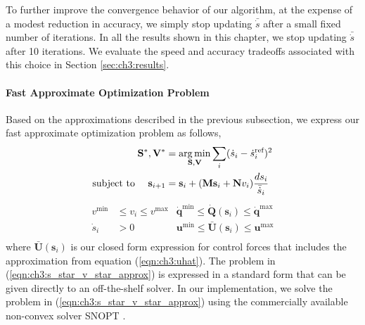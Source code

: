 To further improve the convergence behavior of our algorithm, at the expense of a modest reduction in accuracy, we simply stop updating $\bar{\dot{s}}$ after a small fixed number of iterations.
In all the results shown in this chapter, we stop updating $\bar{\dot{s}}$ after 10 iterations.
We evaluate the speed and accuracy tradeoffs associated with this choice in Section \ref{sec:ch3:results}.

\paragraph{Fast Approximate Optimization Problem}

Based on the approximations described in the previous subsection, we express our fast approximate optimization problem as follows, 
%
\begin{equation*}
\begin{aligned}
\mathbf{S}^{*},\mathbf{V}^{*} & = \operatorname*{arg\,min}_{\mathbf{S},\mathbf{V}} \sum_{i} ( \dot{s}_i - \dot{s}_i^{\text{ref}} )^{2} \\
\text{subject to~~~~}
\mathbf{s}_{i+1}              & =    \mathbf{s}_{i} + (\mathbf{M}\mathbf{s}_{i} + \mathbf{N}v_{i}) \frac{ds_i}{\bar{\dot{s}}_i} \\
\end{aligned}
\end{equation*}
%
\begin{equation}
\begin{aligned}
v^{\text{min}}  & \leq v_i \leq v^{\text{max}} & \dot{\mathbf{q}}^{\text{min}} \leq \dot{\mathbf{Q}}(\mathbf{s}_i) \leq \dot{\mathbf{q}}^{\text{max}} \\
\dot{s}_i       & > 0                                   & \mathbf{u}^{\text{min}}       \leq \bar{\mathbf{U}}(\mathbf{s}_i)       \leq \mathbf{u}^{\text{max}} \\
\end{aligned}
\label{eqn:ch3:s_star_v_star_approx}
\end{equation}
%
where $\bar{\mathbf{U}}(\mathbf{s}_i)$ is our closed form expression for control forces that includes the approximation from equation (\ref{eqn:ch3:uhat}).
The problem in (\ref{eqn:ch3:s_star_v_star_approx}) is expressed in a standard form that can be given directly to an off-the-shelf solver.
In our implementation, we solve the problem in (\ref{eqn:ch3:s_star_v_star_approx}) using the commercially available non-convex solver SNOPT \cite{gill:2002}.


